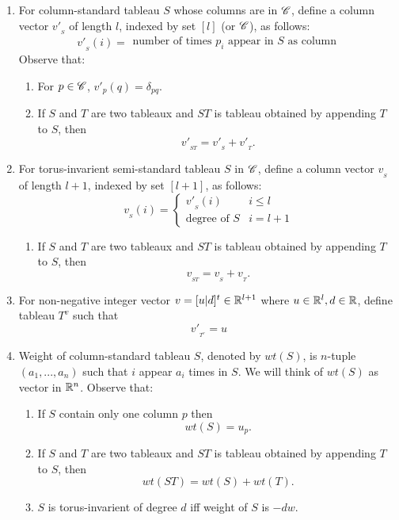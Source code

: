 {\begin{enumerate}
            Let \(P_{\SC} = ker(A)_{_{\ge 0}}\).
        \item For column-standard tableau \(S\) whose columns are in \(\mathscr{C}\),
            define a column vector \(v'_{_S}\) of length \(l\), 
            indexed by set \([l]\) (or \(\mathscr{C}\)), as follows:
            \[
                v'_{_S}(i) = \left.
                \begin{array}{lr}
                    \text{number of times }p_i\text{ appear in }S\text{ as column} 
                \end{array}\right.
            \]
            Observe that:
            \begin{enumerate}
                \item For \(p \in \mathscr{C}\), \(v'_{p}(q) = \delta_{pq}\).
                \item If \(S\) and \(T\) are two tableaux and \(ST\) is tableau obtained 
                    by appending \(T\) to \(S\), then
                    \[v'_{_{ST}} = v'_{_S} + v'_{_T}.\]
            \end{enumerate}
        \item For torus-invarient semi-standard tableau \(S\) in \(\mathscr{C}\), 
            define a column vector \(v_{_S}\) of length \(l+1\), 
            indexed by set \([l+1]\), as follows:
            \[
                v_{_S}(i) = \left\{
                \begin{array}{lr}
                    v'_{_S}(i)          & i \le l\\
                    \text{degree of }S  & i = l+1 
                \end{array}\right.
            \]
            \begin{enumerate}
                \item If \(S\) and \(T\) are two tableaux and \(ST\) is tableau obtained 
                    by appending \(T\) to \(S\), then
                    \[v_{_{ST}} = v_{_S} + v_{_T}.\]
            \end{enumerate}
        \item For non-negative integer vector \(v = [u|d]^t \in \mathbb{R}^{l+1}\) 
            where \(u \in \mathbb{R}^l,d \in \mathbb{R}\), define tableau \(T^v\) such that
            \[v'_{_{T^v}} = u\]
        \item Weight of column-standard tableau \(S\), denoted by \(wt(S)\), 
            is \(n\)-tuple \((a_1,...,a_n)\) such that \(i\) appear \(a_i\) times in \(S\).
            We will think of \(wt(S)\) as vector in \(\mathbb{R}^n\).
            Observe that:
            \begin{enumerate}
                \item If \(S\) contain only one column \(p\) then 
                    \[wt(S) = u_p.\]
                \item If \(S\) and \(T\) are two tableaux and \(ST\) is tableau obtained 
                    by appending \(T\) to \(S\), then
                    \[wt(ST) = wt(S) + wt(T).\]
                \item \(S\) is torus-invarient of degree \(d\) iff weight of \(S\) is \(-dw\).
            \end{enumerate}
    \end{enumerate}
}
